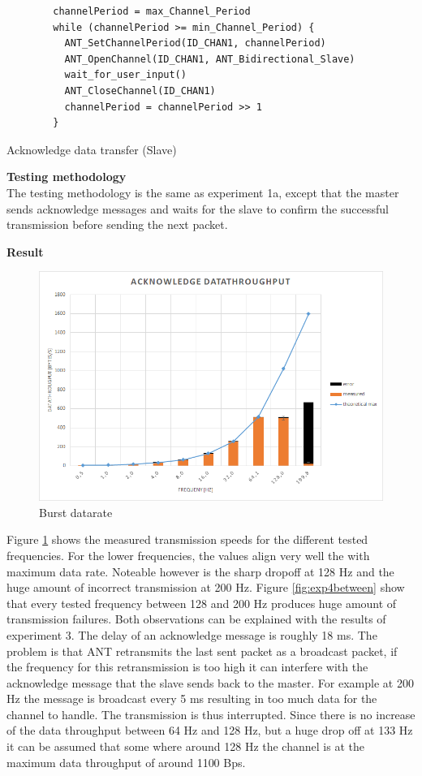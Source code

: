 \begin{description}
	\begin{code}
		\begin{verbatim}
		channelPeriod = max_Channel_Period
		while (channelPeriod >= min_Channel_Period) {
		  ANT_SetChannelPeriod(ID_CHAN1, channelPeriod)
		  ANT_OpenChannel(ID_CHAN1, ANT_Bidirectional_Slave)
		  wait_for_user_input()
		  ANT_CloseChannel(ID_CHAN1)
		  channelPeriod = channelPeriod >> 1
		}
		\end{verbatim}
		\caption{Acknowledge data transfer (Slave)}\label{lst:sExp4}
	\end{code}
	\item{\textbf{Testing methodology}} \hfill \\ The testing methodology is the same as experiment 1a, except that the master sends acknowledge messages and waits for the slave to confirm the successful transmission before sending the next packet. 
	\item{\textbf{Result}} \hfill \\
	\begin{figure}[h]
		\centering
		\includegraphics[scale=0.5]{./pics/exp4_norm.png}
		\caption{Burst datarate}\label{fig:exp4norm}
	\end{figure}
	Figure \ref{fig:exp4norm} shows the measured transmission speeds for the different tested frequencies. For the lower frequencies, the values align very well the with maximum data rate. Noteable however is the sharp dropoff at 128 Hz and the huge amount of incorrect transmission at 200 Hz. Figure \ref{fig:exp4between} show that every tested frequency between 128 and 200 Hz produces huge amount of transmission failures. Both observations can be explained with the results of experiment 3. The delay of an acknowledge message is roughly 18 ms. The problem is that ANT retransmits the last sent packet as a broadcast packet, if the frequency for this retransmission is too high it can interfere with the acknowledge message that the slave sends back to the master. For example at 200 Hz the message is broadcast every 5 ms resulting in too much data for the channel to handle. The transmission is thus interrupted. Since there is no increase of the data throughput between 64 Hz and 128 Hz, but a huge drop off at 133 Hz it can be assumed that some where around 128 Hz the channel is at the maximum data throughput of around 1100 Bps.

\end{description}
